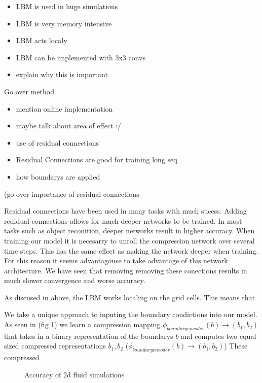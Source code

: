 \documentclass{article}
\begin{document}
\begin{itemize}
  \item LBM is used in huge simulations
  \item LBM is very memory intensive
  \item LBM acts localy
  \item LBM can be implemented with 3x3 convs
  \item explain why this is important
\end{itemize}

Go over method
\begin{itemize}
  \item mention online implementation
  \item maybe talk about area of effect :/
  \item use of residual connections
  \item Residual Connections are good for training long seq
  \item how boundarys are applied
\end{itemize}

(go over importance of residual connections

Residual connections have been used in many tasks with much sucess. Adding redidual connections allows for much deeper networks to be trained. In most tasks such as object reconition, deeper networks result in higher accuracy. When training our model it is necesarry to unroll the compression network over several time steps. This has the same effect as making the network deeper when training. For this reason it seems advantagouse to take advantage of this network architecture. We have seen that removing removing these conections results in much slower convergence and worse accuracy.

As discused in above, the LBM works localing on the grid cells. This means that 

We take a unique approach to inputing the boundary condictions into our model. As seen in (fig 1) we learn a compression mapping $\phi_{boundary encoder}(b) \rightarrow (b_1, b_2)$ that takes in a binary representation of the boundarys $b$ and computes two equal sized compressed representations $b_1, b_2$ ($\phi_{boundary encoder}(b) \rightarrow (b_1, b_2)$) These compressed 

\begin{figure}[!t]
\centering
{}
\caption{Accuracy of 2d fluid simulations }
\label{fig_1}
\end{figure}
\end{document}
